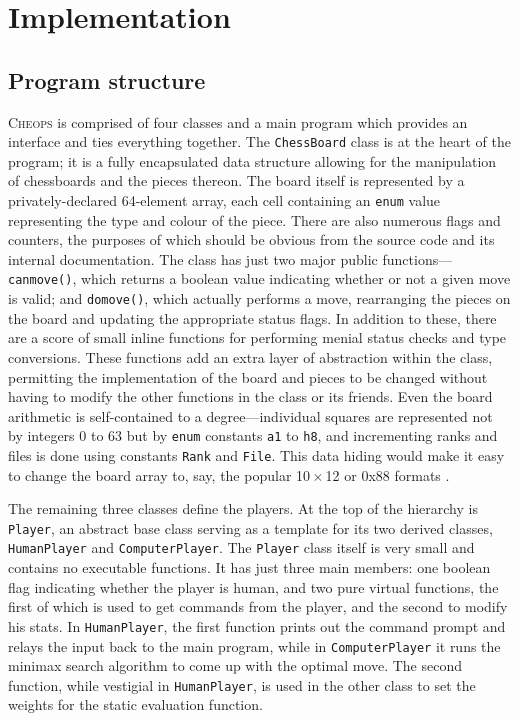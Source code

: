 \documentclass[a4paper]{article}
\begin{document}
\section{Implementation}

\subsection{Program structure}

\textsc{Cheops} is comprised of four classes and a main program which
provides an interface and ties everything together. The
\texttt{ChessBoard} class is at the heart of the program; it is a
fully encapsulated data structure allowing for the manipulation of
chessboards and the pieces thereon. The board itself is represented by
a privately-declared 64-element array, each cell containing an
\texttt{enum} value representing the type and colour of the piece.
There are also numerous flags and counters, the purposes of which
should be obvious from the source code and its internal documentation.
The class has just two major public
functions---\texttt{can{\textunderscore}move()}, which returns a
boolean value indicating whether or not a given move is valid; and
\texttt{do{\textunderscore}move()}, which actually performs a move,
rearranging the pieces on the board and updating the appropriate
status flags. In addition to these, there are a score of small inline
functions for performing menial status checks and type conversions.
These functions add an extra layer of abstraction within the class,
permitting the implementation of the board and pieces to be changed
without having to modify the other functions in the class or its
friends. Even the board arithmetic is self-contained to a
degree---individual squares are represented not by integers 0 to 63
but by \texttt{enum} constants \texttt{a1} to \texttt{h8}, and
incrementing ranks and files is done using constants \texttt{Rank} and
\texttt{File}. This data hiding would make it easy to change the board
array to, say, the popular 10\,$\times$\,12 or 0x88 formats
\cite{eppstein}.

The remaining three classes define the players. At the top of the
hierarchy is \texttt{Player}, an abstract base class serving as a
template for its two derived classes, \texttt{HumanPlayer} and
\texttt{ComputerPlayer}.  The \texttt{Player} class itself is very
small and contains no executable functions. It has just three main
members: one boolean flag indicating whether the player is human, and
two pure virtual functions, the first of which is used to get commands
from the player, and the second to modify his stats. In
\texttt{HumanPlayer}, the first function prints out the command prompt
and relays the input back to the main program, while in
\texttt{ComputerPlayer} it runs the minimax search algorithm to come
up with the optimal move.  The second function, while vestigial in
\texttt{HumanPlayer}, is used in the other class to set the weights
for the static evaluation function.
\end{document}
